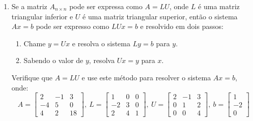\documentclass[a4paper,5pt]{amsbook}
\begin{document}
\begin{enumerate}
	\vspace{0.5cm}
	\item Se a matriz $A_{n\times{}n}$ pode ser expressa como $A=LU$, onde $L$
		\'e uma matriz triangular inferior e $U$ \'e uma matriz triangular
		superior, ent\~ao o sistema $Ax=b$ pode ser expresso como $LUx=b$ e
		resolvido em dois passos:
		\begin{enumerate}
			\item Chame $y = Ux$ e resolva o sistema $Ly=b$ para $y$.
			\item Sabendo o valor de $y$, resolva $Ux=y$ para $x$.
		\end{enumerate}
		Verifique que $A=LU$ e use este m\'etodo para resolver o sistema $Ax=b$, onde:
		\[A = \begin{bmatrix}
				2 & -1 & 3 \\
				-4 & 5 & 0 \\
				4 & 2 & 18
			\end{bmatrix},\ 
		L = \begin{bmatrix}
				1 & 0 & 0 \\
				-2 & 3 & 0 \\
				2 & 4 & 1
			\end{bmatrix},\ 
		U = \begin{bmatrix}
				2 & -1 & 3 \\
				0 & 1 & 2 \\
				0 & 0 & 4
			\end{bmatrix},\ 
		b = \begin{bmatrix}
			1 \\ -2 \\ 0
		\end{bmatrix}\]
\end{enumerate}
\end{document}
